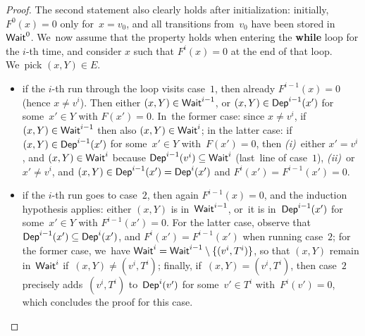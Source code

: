 \begin{proof}
  \smallskip
  The second statement also clearly holds after initialization:
  initially, $F^0(x)=0$ only for~$x=v_0$, and all transitions
  from~$v_0$ have been stored in~$\textsf{Wait}^0$. We~now assume that the
  property holds when entering the \textbf{while} loop for the $i$-th
  time, and consider $x$ such that $F^i(x)=0$ at the end of that
  loop. We~pick $(x,Y)\in E$.
  \begin{itemize}
  \item if the $i$-th run through the loop visits case~$1$, then
    already $F^{i-1}(x)=0$ (hence $x\not=v^i$). Then either
    $(x,Y)\in\textsf{Wait}^{i-1}$, or $(x,Y)\in\textsf{Dep}^{i-1}(x')$ for some~$x'\in Y$
    with $F(x')=0$. In~the former case: since $x\not=v^i$,
    if~$(x,Y)\in\textsf{Wait}^{i-1}$ then also $(x,Y)\in \textsf{Wait}^i$;
    in the latter case: if $(x,Y)\in\textsf{Dep}^{i-1}(x')$ for some~$x'\in Y$
    with~$F(x')=0$, then \emph{(i)}~either $x'=v^i$, and
    $(x,Y)\in\textsf{Wait}^i$ because $\textsf{Dep}^{i-1}(v^i)\subseteq \textsf{Wait}^i$
    (last~line of case~$1$), \emph{(ii)}~or~${x'\not=v^i}$, and
    $(x,Y)\in \textsf{Dep}^{i-1}(x')=\textsf{Dep}^{i}(x')$ and $F^i(x')=F^{i-1}(x')=0$.

  \item if the $i$-th run goes to case~$2$, then again $F^{i-1}(x)=0$,
    and the induction hypothesis applies: either $(x,Y)$ is
    in~$\textsf{Wait}^{i-1}$, or~it is in~$\textsf{Dep}^{i-1}(x')$ for some~$x'\in Y$
    with $F^{i-1}(x')=0$. For the latter case, observe that
    $\textsf{Dep}^{i-1}(x')\subseteq \textsf{Dep}^i(x')$, and $F^{i}(x')=F^{i-1}(x')$
    when running case~$2$; for the former case, we~have
    $\textsf{Wait}^i=\textsf{Wait}^{i-1}\setminus\{(v^i,T^i)\}$, so that $(x,Y)$
    remain in~$\textsf{Wait}^i$ if~$(x,Y)\not=(v^i,T^i)$; finally,
    if~$(x,Y)=(v^i,T^i)$, then case~$2$ precisely adds~$(v^i,T^i)$
    to~$\textsf{Dep}^i(v')$ for some~$v'\in T^i$ with~$F^i(v')=0$, which concludes
    the proof for this case.


\end{itemize}
\end{proof}
